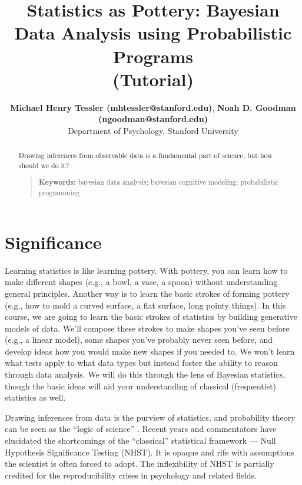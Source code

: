 \documentclass[10pt,letterpaper]{article}
\title{Statistics as Pottery: Bayesian Data Analysis using Probabilistic Programs \\(Tutorial)}
\author{{\large \bf Michael Henry Tessler (mhtessler@stanford.edu)}, {\large \bf Noah D. Goodman (ngoodman@stanford.edu)}  \\
  Department of Psychology, Stanford University
  }
\begin{document}
\maketitle

\begin{abstract}

Drawing inferences from observable data is a fundamental part of science, but how should we do it?
\begin{quote}
\small
\textbf{Keywords:} 
bayesian data analysis; bayesian cognitive modeling; probabilistic programming
\end{quote}

\end{abstract}





\section{Significance}

Learning statistics is like learning pottery. 
With pottery, you can learn how to make different shapes (e.g., a bowl, a vase, a spoon) without understanding general principles. 
Another way is to learn the basic strokes of forming pottery (e.g., how to mold a curved surface, a flat surface, long pointy things). 
In this course, we are going to learn the basic strokes of statistics by building generative models of data. 
We'll compose these strokes to make shapes you've seen before (e.g., a linear model), some shapes you've probably never seen before, and develop ideas how you would make new shapes if you needed to. 
We won't learn what tests apply to what data types but instead foster the ability to reason through data analysis. 
We will do this through the lens of Bayesian statistics, though the basic ideas will aid your understanding of classical (frequentist) statistics as well.

Drawing inferences from data is the purview of statistics, and probability theory can be seen as the ``logic of science'' \cite{jaynes2003probability}.
Recent years and commentators have elucidated the shortcomings of the ``classical'' statistical framework --- Null Hypothesis Significance Testing (NHST). 
It is opaque and rife with assumptions the scientist is often forced to adopt.
The inflexibility of NHST is partially credited for the reproducibility crises in psychology and related fields. 
\end{document}
